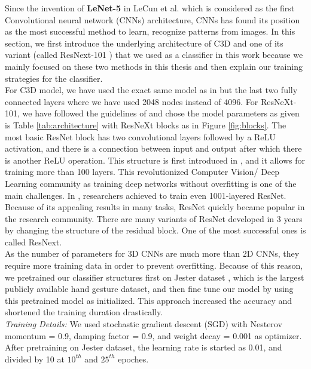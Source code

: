 Since the invention of \textbf{LeNet-5} \cite{lecun_gradient-based_1998} in LeCun et al.  which is considered as the first Convolutional neural network (CNNs) architecture, CNNs has found its position as the most successful method to learn, recognize patterns from images.  In this section, we first introduce the underlying architecture of C3D and one of its variant (called ResNext-101 \cite{xie_aggregated_2016}) that we used as a classifier in this work because we mainly focused on these two methods in this thesis and then explain our training strategies for the classifier.\\

For C3D model, we have used the exact same model as in \cite{tran_learning_2014} but the last two fully connected layers where we have used 2048 nodes instead of 4096. For ResNeXt-101, we have followed the guidelines of \cite{hara3dcnns} and chose the model parameters as given is Table \ref{tab:architecture} with ResNeXt blocks as in Figure \ref{fig:blocks}. The most basic ResNet block has two convolutional layers followed by a ReLU activation, and there is a connection between input and output after which there is another  ReLU operation.   This structure is first introduced in \cite{he_deep_2015}, and it allows for training more than  100 layers.   This revolutionized Computer  Vision/ Deep Learning community as training deep networks without overfitting is one of the main challenges.  In \cite{he_identity_2016}, researchers achieved to train even 1001-layered ResNet.  Because of its appealing results in many tasks,  ResNet quickly became popular in the research community. There are many variants of ResNet developed in 3 years by changing the structure of the residual block. One of the most successful ones is called ResNext.\\

As the number of parameters for 3D CNNs are much more than 2D CNNs, they require more training data in order to prevent overfitting. Because of this reason, we pretrained our classifier structures first on Jester dataset \cite{twentybn_20bn-jester_nodate}, which is the largest publicly available hand gesture dataset, and then fine tune our model by using this pretrained model as initialized.  This approach increased the accuracy and shortened the training duration drastically. \\

\textit{Training Details: } We used stochastic gradient descent (SGD) with Nesterov momentum = 0.9, damping factor = 0.9, and weight decay = 0.001 as optimizer. After pretraining on Jester dataset, the learning rate is started as 0.01, and divided by 10 at $10^{th}$ and $25^{th}$ epoches.\\

